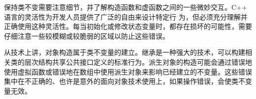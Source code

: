 保持类不变需要注意细节，并了解构造函数和虚函数之间的一些微妙交互。C++ 语言的灵活性为开发人员提供了广泛的自由来设计特定行 为，但必须充分理解并正确使用这种灵活性。每当初始化或修改状态变量时，都存在损坏的可能性，需要仔细注意一些较模糊或较脆弱的区域以防止这些错误。

从技术上讲，对象构造属于类不变量的建立。继承是一种强大的技术，可以构建相关类的层次结构共享公共接口定义的标准行为。派生对象的构造可能会通过错误地使用虚拟函数或错误地在数组中使用派生对象来影响已经建立的不变量。这些错误集中在不正确的、也许是意外的面向对象技术使用上，如果操作错误，会使类不变量无效。
